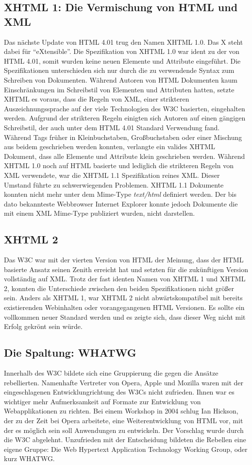 \subsection{XHTML 1: Die Vermischung von HTML und XML}
Das nächste Update von HTML 4.01 trug den Namen XHTML 1.0. Das X steht dabei für
``eXtensible''. Die Spezifikation von XHTML 1.0 war ident zu der von HTML 4.01,
somit wurden keine neuen Elemente und Attribute eingeführt. Die Spezifikationen
unterschieden sich nur durch die zu verwendende Syntax zum Schreiben von
Dokumenten. Während Autoren von HTML Dokumenten kaum Einschränkungen im
Schreibstil von Elementen und Attributen hatten, setzte XHTML es voraus, dass
die Regeln von XML, einer strikteren Auszeichnungssprache auf der viele
Technologien des W3C basierten, eingehalten werden.
Aufgrund der strikteren Regeln einigten sich Autoren auf einen gängigen
Schreibstil, der auch unter dem HTML 4.01 Standard Verwendung fand. Während Tags
früher in Kleinbuchstaben, Großbuchstaben oder einer Mischung aus beidem
geschrieben werden konnten, verlangte ein valides XHTML Dokument, dass alle
Elemente und Attribute klein geschrieben werden.
Während XHTML 1.0 noch auf HTML basierte und lediglich die strikteren Regeln von
XML verwendete, war die XHTML 1.1 Spezifikation reines XML. Dieser Umstand
führte zu schwerwiegenden Problemen. XHTML 1.1 Dokumente konnten nicht mehr
unter dem Mime-Type \textit{text/html} definiert werden. Der bis dato
bekannteste Webbrowser Internet Explorer konnte jedoch Dokumente die mit einem
XML Mime-Type publiziert wurden, nicht darstellen.

\subsection{XHTML 2}
Das W3C war mit der vierten Version von HTML der Meinung, dass der HTML basierte
Ansatz seinen Zenith erreicht hat und setzten für die zukünftigen Version
vollständig auf XML. Trotz der fast identen Namen von XHTML 1 und XHTML 2,
konnten die Unterschiede zwischen den beiden Spezifikationen nicht größer sein.
Anders als XHTML 1, war XHTML 2 nicht abwärtskompatibel mit bereits
existierenden Webinhalten oder vorangegangenen HTML Versionen. Es sollte ein
vollkommen neuer Standard werden und es zeigte sich, dass dieser Weg nicht mit
Erfolg gekrönt sein würde.

\subsection{Die Spaltung: WHATWG}
Innerhalb des W3C bildete sich eine Gruppierung die gegen die Ansätze
rebellierten. Namenhafte Vertreter von Opera, Apple und Mozilla waren mit der
eingeschlagenen Entwicklungrichtung des W3Cs nicht zufrieden. Ihnen war es
wichtiger mehr Aufmerksamkeit auf Formate zur Entwicklung von Webapplikationen
zu richten.
Bei einem Workshop in 2004 schlug Ian Hickson, der zu der Zeit bei Opera
arbeitete, eine Weiterentwicklung von HTML vor, mit der es möglich sein soll
Anwendungen zu entwickeln. Der Vorschlag wurde durch die W3C abgelehnt.
Unzufrieden mit der Entscheidung bildeten die Rebellen eine eigene Gruppe: Die
Web Hypertext Application Technology Working Group, oder kurz WHATWG.

